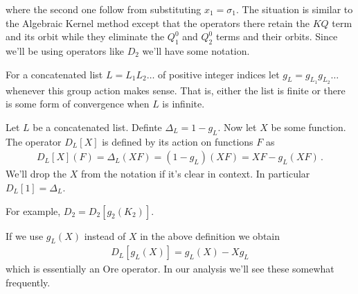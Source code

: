 where the second one follow from substituting $x_1 = \sigma_1$.
The situation is similar to the Algebraic Kernel method except that the operators there retain the $KQ$ term and its orbit while they eliminate the $Q_1^0$ and $Q_2^0$ terms and their orbits. Since we'll be using operators like $D_2$ we'll have some notation.
\begin{definition} For a concatenated list $L = L_1L_2\ldots$ of positive integer indices let $g_L = g_{L_1}g_{L_2}\ldots$ whenever this group action makes sense. That is, either the list is finite or there is some form of convergence when $L$ is infinite.
\end{definition}
\begin{definition} Let $L$ be a concatenated list. Definte $\Delta_L = 1 - g_L$. Now let $X$ be some function. The operator $D_L[X]$ is defined by its action on functions $F$ as
\begin{align}
	D_L[X](F) =\Delta_L(XF) = (1-g_L)(XF) = XF-g_L(XF)\,.
\end{align}
We'll drop the $X$ from the notation if it's clear in context. In particular $D_L[1] = \Delta_L$.
\end{definition}
For example, $D_2 = D_2[g_2(K_2)]$.
\begin{example} If we use $g_L(X)$ instead of $X$ in the above definition we obtain
\begin{align}
	D_L[g_L(X)] = g_L(X) - Xg_L
\end{align}
which is essentially an Ore operator. In our analysis we'll see these somewhat frequently.
\end{example}
